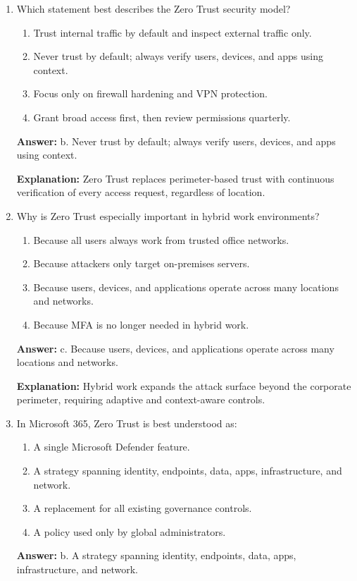 \documentclass[10pt]{article}
\begin{document}
\begin{enumerate}[leftmargin=*]

\item Which statement best describes the Zero Trust security model?
\begin{enumerate}[label=\alph*., leftmargin=1.5em]
\item Trust internal traffic by default and inspect external traffic only.
\item Never trust by default; always verify users, devices, and apps using context.
\item Focus only on firewall hardening and VPN protection.
\item Grant broad access first, then review permissions quarterly.
\end{enumerate}
\textbf{Answer:} b. Never trust by default; always verify users, devices, and apps using context.

\textbf{Explanation:} Zero Trust replaces perimeter-based trust with continuous verification of every access request, regardless of location.

\item Why is Zero Trust especially important in hybrid work environments?
\begin{enumerate}[label=\alph*., leftmargin=1.5em]
\item Because all users always work from trusted office networks.
\item Because attackers only target on-premises servers.
\item Because users, devices, and applications operate across many locations and networks.
\item Because MFA is no longer needed in hybrid work.
\end{enumerate}
\textbf{Answer:} c. Because users, devices, and applications operate across many locations and networks.

\textbf{Explanation:} Hybrid work expands the attack surface beyond the corporate perimeter, requiring adaptive and context-aware controls.

\item In Microsoft 365, Zero Trust is best understood as:
\begin{enumerate}[label=\alph*., leftmargin=1.5em]
\item A single Microsoft Defender feature.
\item A strategy spanning identity, endpoints, data, apps, infrastructure, and network.
\item A replacement for all existing governance controls.
\item A policy used only by global administrators.
\end{enumerate}
\textbf{Answer:} b. A strategy spanning identity, endpoints, data, apps, infrastructure, and network.


\end{enumerate}
\end{document}
